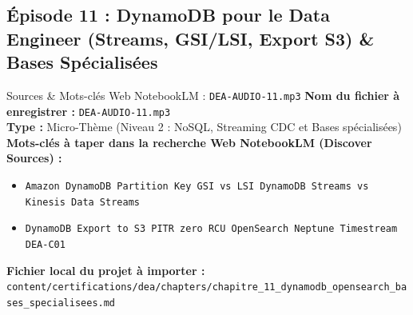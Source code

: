 \documentclass[11pt,a4paper]{article}
\begin{document}
\subsection{Épisode 11 : DynamoDB pour le Data Engineer (Streams, GSI/LSI, Export S3) \& Bases Spécialisées}
\begin{sourcebox}{Sources \& Mots-clés Web NotebookLM : \texttt{DEA-AUDIO-11.mp3}}
\textbf{Nom du fichier à enregistrer :} \texttt{DEA-AUDIO-11.mp3}\\
\textbf{Type :} Micro-Thème (Niveau 2 : NoSQL, Streaming CDC et Bases spécialisées)\\
\textbf{Mots-clés à taper dans la recherche Web NotebookLM (Discover Sources) :}
\begin{itemize}[noitemsep]
    \item \texttt{Amazon DynamoDB Partition Key GSI vs LSI DynamoDB Streams vs Kinesis Data Streams}
    \item \texttt{DynamoDB Export to S3 PITR zero RCU OpenSearch Neptune Timestream DEA-C01}
\end{itemize}
\textbf{Fichier local du projet à importer :}
\texttt{content/certifications/dea/chapters/chapitre_11_dynamodb_opensearch_bases_specialisees.md}
\end{sourcebox}
\end{document}
